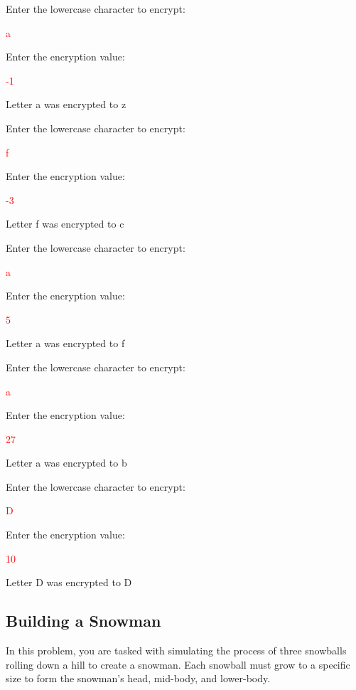 \begin{sample}
Enter the lowercase character to encrypt:

\textcolor{red}{a}

Enter the encryption value:

\textcolor{red}{-1}

Letter a was encrypted to z
\end{sample}

\begin{sample}
Enter the lowercase character to encrypt:

\textcolor{red}{f}

Enter the encryption value:

\textcolor{red}{-3}

Letter f was encrypted to c
\end{sample}

\begin{sample}
Enter the lowercase character to encrypt:

\textcolor{red}{a}

Enter the encryption value:

\textcolor{red}{5}

Letter a was encrypted to f
\end{sample}

\begin{sample}
Enter the lowercase character to encrypt:

\textcolor{red}{a}

Enter the encryption value:

\textcolor{red}{27}

Letter a was encrypted to b
\end{sample}

\begin{sample}
Enter the lowercase character to encrypt:

\textcolor{red}{D}

Enter the encryption value:

\textcolor{red}{10}

Letter D was encrypted to D
\end{sample}

\subsection{Building a Snowman}

In this problem, you are tasked with simulating the process of three snowballs rolling down a hill to create a snowman. Each snowball must grow to a specific size to form the snowman's head, mid-body, and lower-body. 

